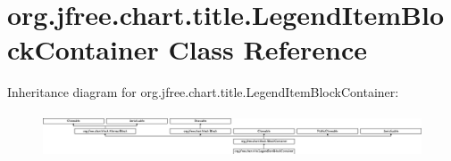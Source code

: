 \hypertarget{classorg_1_1jfree_1_1chart_1_1title_1_1_legend_item_block_container}{}\section{org.\+jfree.\+chart.\+title.\+Legend\+Item\+Block\+Container Class Reference}
\label{classorg_1_1jfree_1_1chart_1_1title_1_1_legend_item_block_container}
Inheritance diagram for org.\+jfree.\+chart.\+title.\+Legend\+Item\+Block\+Container\+:\begin{figure}[H]
\begin{center}
\leavevmode
\includegraphics[height=1.338112cm]{classorg_1_1jfree_1_1chart_1_1title_1_1_legend_item_block_container}
\end{center}
\end{figure}
